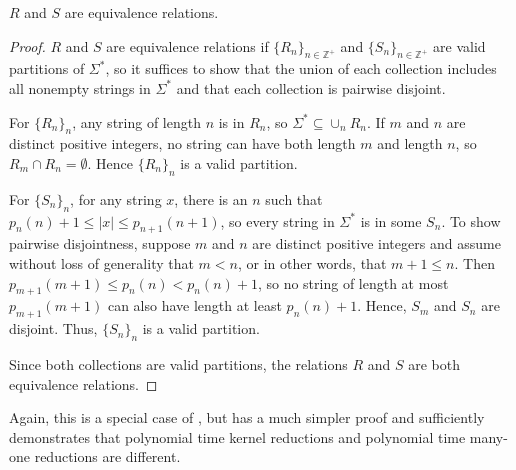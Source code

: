 \begin{lemma}
  $R$ and $S$ are equivalence relations.
\end{lemma}
\begin{proof}
  $R$ and $S$ are equivalence relations if $\{R_n\}_{n \in \mathbb{Z}^+}$ and $\{S_n\}_{n \in \mathbb{Z}^+}$ are valid partitions of $\Sigma^*$, so it suffices to show that the union of each collection includes all nonempty strings in $\Sigma^*$ and that each collection is pairwise disjoint.

  For $\{R_n\}_n$, any string of length $n$ is in $R_n$, so $\Sigma^* \subseteq \cup_n R_n$.
  If $m$ and $n$ are distinct positive integers, no string can have both length $m$ and length $n$, so $R_m \cap R_n = \emptyset$.
  Hence $\{R_n\}_n$ is a valid partition.

  For $\{S_n\}_n$, for any string $x$, there is an $n$ such that $p_n(n) + 1 \leq |x| \leq p_{n + 1}(n + 1)$, so every string in $\Sigma^*$ is in some $S_n$.
  To show pairwise disjointness, suppose $m$ and $n$ are distinct positive integers and assume without loss of generality that $m < n$, or in other words, that $m + 1 \leq n$.
  Then $p_{m + 1}(m + 1) \leq p_n(n) < p_n(n) + 1$, so no string of length at most $p_{m + 1}(m + 1)$ can also have length at least $p_n(n) + 1$.
  Hence, $S_m$ and $S_n$ are disjoint.
  Thus, $\{S_n\}_n$ is a valid partition.

  Since both collections are valid partitions, the relations $R$ and $S$ are both equivalence relations.
\end{proof}

Again, this is a special case of \autocite[Theorem~5.1]{bcffm}, but has a much simpler proof and sufficiently demonstrates that polynomial time kernel reductions and polynomial time many-one reductions are different.


